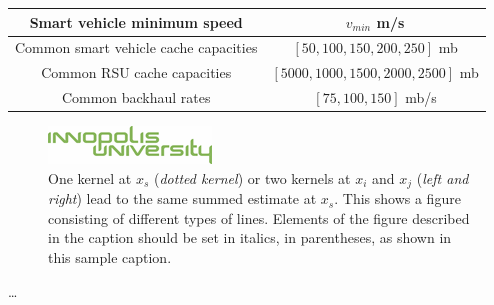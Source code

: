 \begin{longtable}{c|c}
  \hline
  Smart vehicle minimum speed           & $v_{min}$ m/s                                                                        \\
  \hline
  Common smart vehicle cache capacities & $[50, 100, 150, 200, 250]$ mb                                                        \\
  \hline
  Common RSU cache capacities           & $[5000,1000,1500,2000,2500]$ mb                                                      \\
  \hline
  Common backhaul rates                 & $[75, 100, 150]$ mb/s                                                                \\
  \hline
\end{longtable}

\begin{figure}[hbt]
  \centering
  \includegraphics[]{figs/inno.png}
  \caption{One kernel at $x_s$ (\emph{dotted kernel}) or two kernels at
    $x_i$ and $x_j$ (\textit{left and right}) lead to the same summed estimate
    at $x_s$. This shows a figure consisting of different types of
    lines. Elements of the figure described in the caption should be set in
    italics, in parentheses, as shown in this sample caption.}
  \label{fig:thiex}
\end{figure}


\ldots
